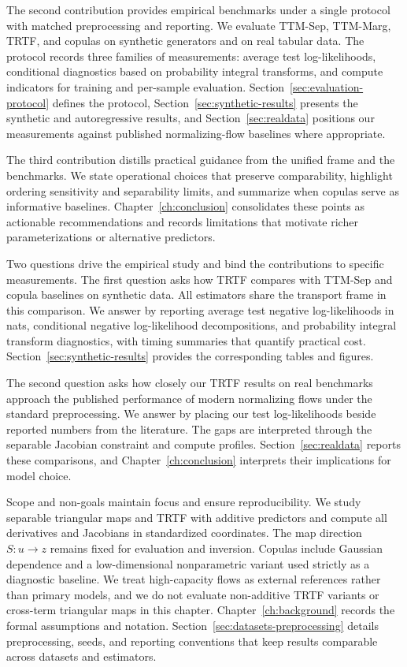 \documentclass[11pt,a4paper,twoside]{book}\usepackage[]{graphicx}\usepackage[]{xcolor}
\begin{document}
The second contribution provides empirical benchmarks under a single protocol with matched preprocessing and reporting. We evaluate TTM-Sep, TTM-Marg, TRTF, and copulas on synthetic generators and on real tabular data. The protocol records three families of measurements: average test log-likelihoods, conditional diagnostics based on probability integral transforms, and compute indicators for training and per-sample evaluation. Section~\ref{sec:evaluation-protocol} defines the protocol, Section~\ref{sec:synthetic-results} presents the synthetic and autoregressive results, and Section~\ref{sec:realdata} positions our measurements against published normalizing-flow baselines where appropriate.

The third contribution distills practical guidance from the unified frame and the benchmarks. We state operational choices that preserve comparability, highlight ordering sensitivity and separability limits, and summarize when copulas serve as informative baselines. Chapter~\ref{ch:conclusion} consolidates these points as actionable recommendations and records limitations that motivate richer parameterizations or alternative predictors.

Two questions drive the empirical study and bind the contributions to specific measurements. The first question asks how TRTF compares with TTM-Sep and copula baselines on synthetic data. All estimators share the transport frame in this comparison. We answer by reporting average test negative log-likelihoods in nats, conditional negative log-likelihood decompositions, and probability integral transform diagnostics, with timing summaries that quantify practical cost. Section~\ref{sec:synthetic-results} provides the corresponding tables and figures.

The second question asks how closely our TRTF results on real benchmarks approach the published performance of modern normalizing flows under the standard preprocessing. We answer by placing our test log-likelihoods beside reported numbers from the literature. The gaps are interpreted through the separable Jacobian constraint and compute profiles. Section~\ref{sec:realdata} reports these comparisons, and Chapter~\ref{ch:conclusion} interprets their implications for model choice.

Scope and non-goals maintain focus and ensure reproducibility. We study separable triangular maps and TRTF with additive predictors and compute all derivatives and Jacobians in standardized coordinates. The map direction $S:u \to z$ remains fixed for evaluation and inversion. Copulas include Gaussian dependence and a low-dimensional nonparametric variant used strictly as a diagnostic baseline. We treat high-capacity flows as external references rather than primary models, and we do not evaluate non-additive TRTF variants or cross-term triangular maps in this chapter. Chapter~\ref{ch:background} records the formal assumptions and notation. Section~\ref{sec:datasets-preprocessing} details preprocessing, seeds, and reporting conventions that keep results comparable across datasets and estimators.
\end{document}
